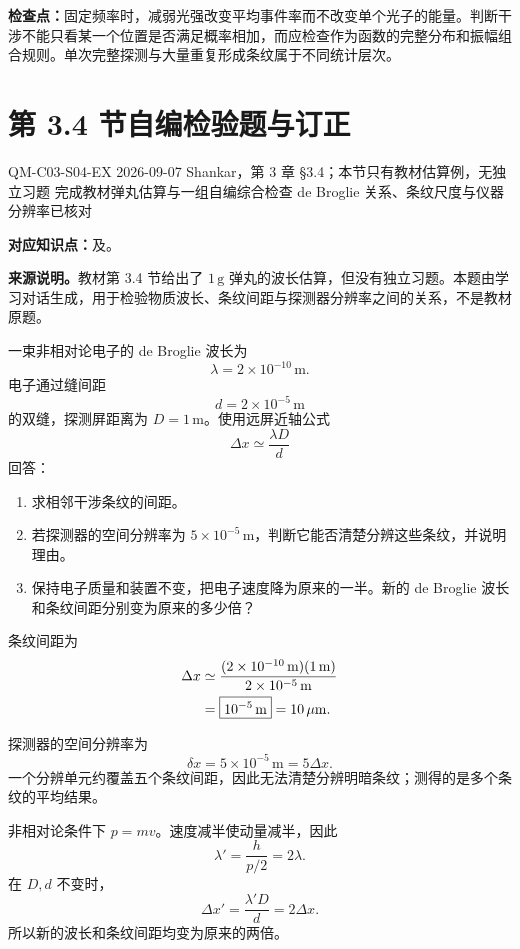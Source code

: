 \textbf{检查点：}固定频率时，减弱光强改变平均事件率而不改变单个光子的能量。判断干涉不能只看某一个位置是否满足概率相加，而应检查作为函数的完整分布和振幅组合规则。单次完整探测与大量重复形成条纹属于不同统计层次。

\section{第 3.4 节自编检验题与订正}
\label{exercise-set:QM-C03-S04}

\exercisemeta
  {QM-C03-S04-EX}
  {2026-09-07}
  {Shankar，第 3 章 \S 3.4；本节只有教材估算例，无独立习题}
  {完成教材弹丸估算与一组自编综合检查}
  {de Broglie 关系、条纹尺度与仪器分辨率已核对}


\textbf{对应知识点：}及。

\textbf{来源说明。}教材第 3.4 节给出了 $1\,\mathrm{g}$ 弹丸的波长估算，但没有独立习题。本题由学习对话生成，用于检验物质波长、条纹间距与探测器分辨率之间的关系，不是教材原题。

一束非相对论电子的 de Broglie 波长为
\[
  \lambda=2\times10^{-10}\,\mathrm{m}.
\]
电子通过缝间距
\[
  d=2\times10^{-5}\,\mathrm{m}
\]
的双缝，探测屏距离为 $D=1\,\mathrm{m}$。使用远屏近轴公式
\[
  \Delta x\simeq\frac{\lambda D}{d}
\]
回答：
\begin{enumerate}[leftmargin=*]
  \item 求相邻干涉条纹的间距。
  \item 若探测器的空间分辨率为 $5\times10^{-5}\,\mathrm{m}$，判断它能否清楚分辨这些条纹，并说明理由。
  \item 保持电子质量和装置不变，把电子速度降为原来的一半。新的 de Broglie 波长和条纹间距分别变为原来的多少倍？
\end{enumerate}

\begin{checkedsolution}
条纹间距为
\begin{align}
  \Delta x
  &\simeq
  \frac{(2\times10^{-10}\,\mathrm{m})(1\,\mathrm{m})}
       {2\times10^{-5}\,\mathrm{m}}
  \notag\\
  &=\boxed{10^{-5}\,\mathrm{m}}
   =10\,\mu\mathrm{m}.
  \label{eq:QM-C03-S04-E01-fringe-spacing}
\end{align}

探测器的空间分辨率为
\[
  \delta x=5\times10^{-5}\,\mathrm{m}
  =5\Delta x.
\]
一个分辨单元约覆盖五个条纹间距，因此无法清楚分辨明暗条纹；测得的是多个条纹的平均结果。

非相对论条件下 $p=mv$。速度减半使动量减半，因此
\[
  \lambda'=\frac{h}{p/2}=2\lambda.
\]
在 $D,d$ 不变时，
\[
  \Delta x'
  =\frac{\lambda'D}{d}
  =2\Delta x.
\]
所以新的波长和条纹间距均变为原来的两倍。
\end{checkedsolution}

